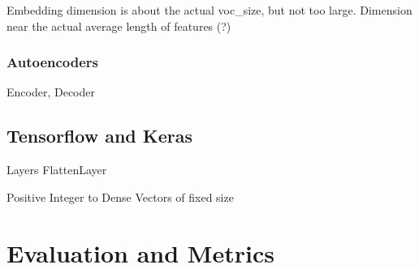 Embedding dimension is about the actual voc\_size, but not too large.
Dimension near the actual average length of features (?)

\subsubsection{Autoencoders}
\label{subsubsec:autoencoder}

Encoder, Decoder

\subsection{Tensorflow and Keras}
Layers
FlattenLayer

Positive Integer to Dense Vectors of fixed size

\section{Evaluation and Metrics}

%
%
%
%

